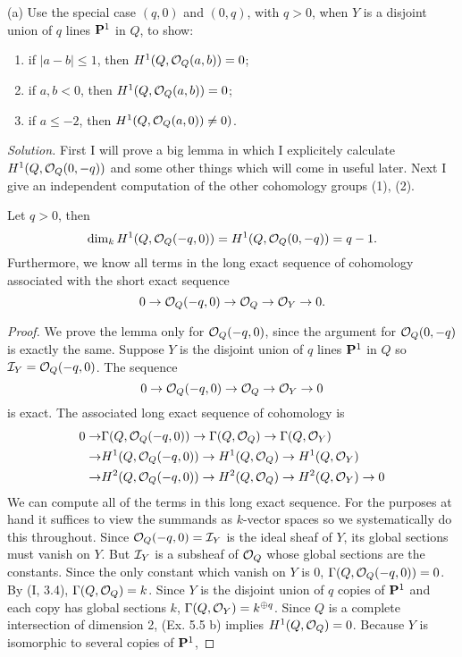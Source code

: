 \documentclass[12pt]{article}
\begin{document}
\begin{exercise}
\noindent(a) Use the special case $(q,0)$ and $(0,q)$, with $q>0$, when $Y$
is a disjoint union of $q$ lines $\P^1$ in $Q$, to show:
\begin{enumerate}
\item if $|a-b|\leq 1$, then $H^1(Q,\so_Q(a,b))=0$;
\item if $a,b<0$, then $H^1(Q,\so_Q(a,b))=0$;
\item if $a\leq-2$, then $H^1(Q,\so_Q(a,0))\neq 0)$.
\end{enumerate}
{\em Solution.}
First I will prove a big lemma in which I explicitely
calculate $H^1(Q,\soq(0,-q))$ and some other things
which will come in useful later. Next I give an independent
computation of the other cohomology groups (1), (2).  
\par\begin{lem} Let $q>0$, then 
$$\dim_k H^1(Q,\soq(-q,0))=H^1(Q,\soq(0,-q))=q-1.$$
Furthermore, we know all terms in the long exact
sequence of cohomology associated with the short exact sequence
$$0\into\soq(-q,0)\into\soq\into\sO_Y\into{}0.$$
\end{lem}
\begin{proof}
We prove the lemma only for $\soq(-q,0)$, since the argument
for $\soq(0,-q)$ is exactly the same. Suppose $Y$ is the disjoint
union of $q$ lines $\P^1$ in $Q$ so $\sI_Y=\soq(-q,0)$.  
The sequence 
$$0\into\soq(-q,0)\into\soq\into\sO_Y\into{}0$$
is exact. The associated long exact sequence of cohomology is
\begin{align*}
0\into&\Gamma(Q,\soq(-q,0))\into\Gamma(Q,\soq)\into\Gamma(Q,\sO_Y)\\
\into& H^1(Q,\soq(-q,0))\into{}H^1(Q,\soq)\into{}H^1(Q,\sO_Y)\\
\into& H^2(Q,\soq(-q,0))\into{}H^2(Q,\soq)\into{}H^2(Q,\sO_Y)\into 0
\end{align*}
We can compute all of the terms in this long exact sequence. For
the purposes at hand it suffices to view the summands as $k$-vector
spaces so we systematically do this throughout. 
Since $\soq(-q,0)=\sI_Y$ is the ideal sheaf of $Y$, 
its global sections must vanish on $Y$. But $\sI_Y$ is a subsheaf
of $\sO_Q$ whose global sections are the constants. Since the
only constant which vanish on $Y$ is $0$, $\Gamma(Q,\soq(-q,0))=0$.
By (I, 3.4), $\Gamma(Q,\soq)=k$. Since $Y$ is the disjoint union
of $q$ copies of $\P^1$ and each copy has global sections $k$,
$\Gamma(Q,\sO_Y)=k^{\oplus{}q}$. Since $Q$ is a complete intersection of
dimension 2, (Ex. 5.5 b) implies $H^1(Q,\soq)=0$. 
Because $Y$ is isomorphic to several copies of $\P^1$, 

\end{proof}
\end{exercise}
\end{document}
